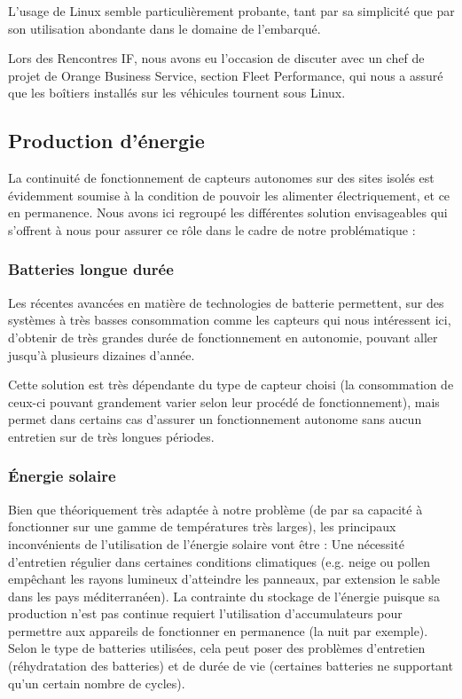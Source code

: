 L’usage de Linux semble particulièrement probante, tant par sa simplicité que par son utilisation abondante dans le domaine de l’embarqué.

Lors des Rencontres IF, nous avons eu l’occasion de discuter avec un chef de projet de Orange Business Service, section Fleet Performance, qui nous a assuré que les boîtiers installés sur les véhicules tournent sous Linux.

\subsection{Production d'énergie}

La continuité de fonctionnement de capteurs autonomes sur des sites isolés est évidemment soumise à la condition de pouvoir les alimenter électriquement, et ce en permanence. Nous avons ici regroupé les différentes solution envisageables qui s’offrent à nous pour assurer ce rôle dans le cadre de notre problématique :

\subsubsection{Batteries longue durée}

Les récentes avancées en matière de technologies de batterie permettent, sur des systèmes à très basses consommation comme les capteurs qui nous intéressent ici, d’obtenir de très grandes durée de fonctionnement en autonomie, pouvant aller jusqu’à plusieurs dizaines d’année.

Cette solution est très dépendante du type de capteur choisi (la consommation de ceux-ci pouvant grandement varier selon leur procédé de fonctionnement), mais permet dans certains cas d’assurer un fonctionnement autonome sans aucun entretien sur de très longues périodes.

\subsubsection{Énergie solaire}

Bien que théoriquement très adaptée à notre problème (de par sa capacité à fonctionner sur une gamme de températures très larges), les principaux inconvénients de l’utilisation de l’énergie solaire vont être :
Une nécessité d’entretien régulier dans certaines conditions climatiques (e.g. neige ou pollen empêchant les rayons lumineux d’atteindre les panneaux, par extension le sable dans les pays méditerranéen).
La contrainte du stockage de l’énergie puisque sa production n’est pas continue requiert l’utilisation d’accumulateurs pour permettre aux appareils de fonctionner en permanence (la nuit par exemple). Selon le type de batteries utilisées, cela peut poser des problèmes d’entretien (réhydratation des batteries) et de durée de vie (certaines batteries ne supportant qu’un certain nombre de cycles).


